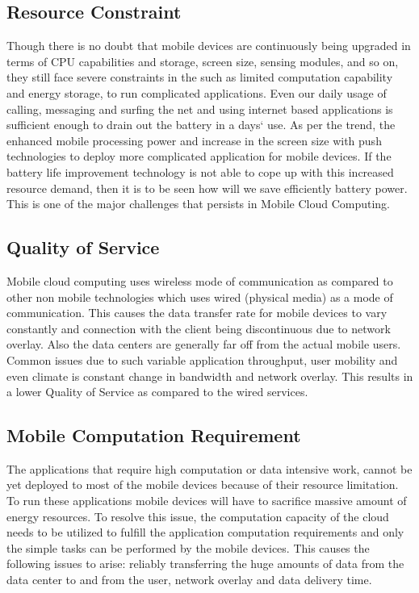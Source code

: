 \documentclass[10pt, conference, compsocconf]{IEEEtran}
\begin{document}
\subsection{Resource Constraint}
Though there is no doubt that mobile devices are continuously being upgraded in terms of CPU capabilities and storage, screen size, sensing modules, and so on, they still face severe constraints in the such as limited computation capability and energy storage, to run complicated applications. Even our daily usage of calling, messaging and surfing the net and using internet based applications is sufficient enough to drain out the battery in a days` use. As per the trend, the enhanced mobile processing power and increase in the screen size with push technologies to deploy more complicated application for mobile devices. If the battery life improvement technology is not able to cope up with this increased resource demand, then it is to be seen how will we save efficiently battery power. This is one of the major challenges that persists in  Mobile Cloud Computing.
\subsection{Quality of Service}
Mobile cloud computing uses wireless mode of communication as compared to other non mobile technologies which uses wired (physical media) as a mode of communication. This causes the data transfer rate for mobile devices to vary constantly and connection with the client being discontinuous due to network overlay. Also the data centers are generally far off from the actual mobile users. Common issues due to such variable application throughput, user mobility and even climate is constant change in bandwidth and network overlay. This results in a lower Quality of Service as compared to the wired services.
\subsection{Mobile Computation Requirement}
The applications that require high computation or data intensive work, cannot be yet deployed to most of the mobile devices because of their resource limitation. To run these applications mobile devices will have to sacrifice massive amount of energy resources.   To resolve this issue, the computation capacity of the cloud needs to be utilized to fulfill the application computation requirements and only the simple tasks can be performed by the mobile devices. This causes the following issues to arise: reliably transferring the huge amounts of data from the data center to and from the user, network overlay and data delivery time.
\end{document}
